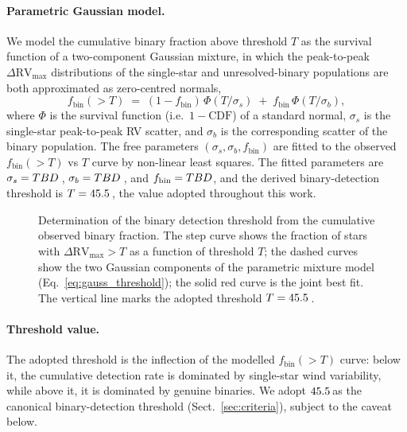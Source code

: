 \paragraph{Parametric Gaussian model.}
We model the cumulative binary fraction above threshold $T$ as the
survival function of a two-component Gaussian mixture, in which the
peak-to-peak $\Delta\mathrm{RV}_{\max}$ distributions of the
single-star and unresolved-binary populations are both approximated as
zero-centred normals,
\begin{equation}
f_\mathrm{bin}(>T)
  \;=\; (1 - f_\mathrm{bin})\,\Phi(T/\sigma_s)
        \;+\; f_\mathrm{bin}\,\Phi(T/\sigma_b),
\label{eq:gauss_threshold}
\end{equation}
where $\Phi$ is the survival function (i.e.\ $1 - \mathrm{CDF}$) of a
standard normal, $\sigma_s$ is the single-star peak-to-peak RV
scatter, and $\sigma_b$ is the corresponding scatter of the binary
population. The free parameters $(\sigma_s, \sigma_b, f_\mathrm{bin})$
are fitted to the observed $f_\mathrm{bin}(>T)$ vs $T$ curve by
non-linear least squares. The fitted parameters are
$\sigma_s = TBD$\,\kms,
$\sigma_b = TBD$\,\kms, and
$f_\mathrm{bin} = TBD$, and the derived binary-detection
threshold is $T = 45.5$\,\kms, the value adopted throughout this
work.

\begin{figure}
\centering
\caption{Determination of the binary detection threshold from the
  cumulative observed binary fraction. The step curve shows the fraction
  of stars with $\Delta\mathrm{RV}_{\max} > T$ as a function of threshold
  $T$; the dashed curves show the two Gaussian components of the
  parametric mixture model (Eq.~\ref{eq:gauss_threshold}); the solid red
  curve is the joint best fit. The vertical line marks the adopted
  threshold $T = 45.5$\,\kms.}
\label{fig:threshold_derivation}
\end{figure}

\paragraph{Threshold value.}
The adopted threshold is the inflection of the modelled
$f_\mathrm{bin}(>T)$ curve: below it, the cumulative detection rate is
dominated by single-star wind variability, while above it, it is
dominated by genuine binaries. We adopt $45.5$\,\kms as the
canonical binary-detection threshold (Sect.~\ref{sec:criteria}),
subject to the caveat below.

